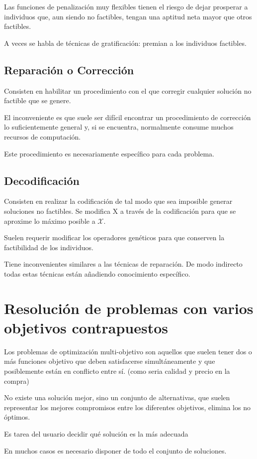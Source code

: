 \documentclass[12pt, twoside, openright]{report} %
\begin{document}
Las funciones de penalización muy flexibles tienen el riesgo de dejar prosperar a individuos que, aun siendo no factibles, tengan una aptitud neta mayor que otros factibles.

A veces se habla de técnicas de gratificación: premian a los individuos factibles.

\subsection{Reparación o Corrección}
Consisten en habilitar un procedimiento con el que corregir cualquier solución no factible que se genere.

El inconveniente es que suele ser difícil encontrar un procedimiento de corrección lo suficientemente general y, si se encuentra, normalmente consume muchos recursos de computación.

Este procedimiento es necesariamente específico para cada problema.

\subsection{Decodificación}
Consisten en realizar la codificación de tal modo que sea imposible generar soluciones no factibles. Se modifica X a través de la codificación para que se aproxime lo máximo posible a $\mathcal{X}$.

Suelen requerir modificar los operadores genéticos para que conserven la factibilidad de los individuos.

Tiene inconvenientes similares a las técnicas de reparación. De modo indirecto todas estas técnicas están añadiendo conocimiento específico.

\section{Resolución de problemas con varios objetivos contrapuestos}
Los problemas de optimización multi-objetivo son aquellos que suelen tener dos o más funciones objetivo que deben satisfacerse simultáneamente y que posiblemente están en conflicto entre sí. (como seria calidad y precio en la compra)

No existe una solución mejor, sino un conjunto de alternativas, que suelen representar los mejores compromisos entre los diferentes objetivos, elimina los no óptimos.

Es tarea del usuario decidir qué solución es la más adecuada

En muchos casos es necesario disponer de todo el conjunto de soluciones.
\end{document}
